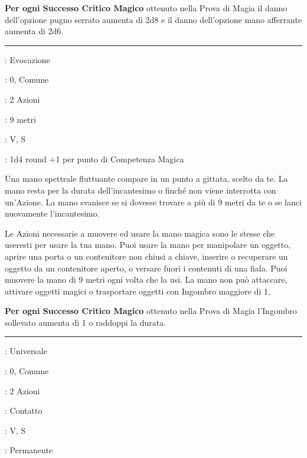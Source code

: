 \begin{multicols}{2}
\textbf{Per ogni Successo Critico Magico} ottenuto nella Prova di Magia il danno dell'opzione pugno serrato aumenta di 2d8 e il danno dell'opzione mano afferrante aumenta di 2d6.

\smallskip\noindent\rule{\linewidth}{2pt} \hypertarget{Mano Magica}{}\smallskip{}
\noindent
\begin{description}[noitemsep, topsep=0pt, parsep=0pt, partopsep=0pt, leftmargin=0cm, labelwidth=2.8cm]
	\item[\textbf{Lista di Magia}]: Evocazione
	\item[\textbf{Livello}]: 0, Comune
	\item[\textbf{T. di Lancio}]: 2 Azioni
	\item[\textbf{Gittata}]: 9 metri
	\item[\textbf{Componenti}]: V, S
	\item[\textbf{Durata}]: 1d4 round +1 per punto di Competenza Magica
\end{description}

Una mano spettrale fluttuante compare in un punto a gittata, scelto da te. La mano resta per la durata dell'incantesimo o finché non viene interrotta con un'Azione. La mano svanisce se si dovesse trovare a più di 9 metri da te o se lanci nuovamente l'incantesimo.

Le Azioni necessarie a muovere ed usare la mano magica sono le stesse che useresti per usare la tua mano. Puoi usare la mano per manipolare un oggetto, aprire una porta o un contenitore non chiusi a chiave, inserire o recuperare un oggetto da un contenitore aperto, o versare fuori i contenuti di una fiala. Puoi muovere la mano di 9 metri ogni volta che la usi. La mano non può attaccare, attivare oggetti magici o trasportare oggetti con Ingombro maggiore di 1.

\textbf{Per ogni Successo Critico Magico} ottenuto nella Prova di Magia l'Ingombro sollevato aumenta di 1 o raddoppi la durata.


\smallskip\noindent\rule{\linewidth}{2pt} \hypertarget{Marchio Magico}{}\smallskip{}
\noindent
\begin{description}[noitemsep, topsep=0pt, parsep=0pt, partopsep=0pt, leftmargin=0cm, labelwidth=2.8cm]
	\item[\textbf{Lista di Magia}]: Universale
	\item[\textbf{Livello}]: 0, Comune
	\item[\textbf{T. di Lancio}]: 2 Azioni
	\item[\textbf{Gittata}]: Contatto
	\item[\textbf{Componenti}]: V, S
	\item[\textbf{Durata}]: Permanente
\end{description}


\end{multicols}
